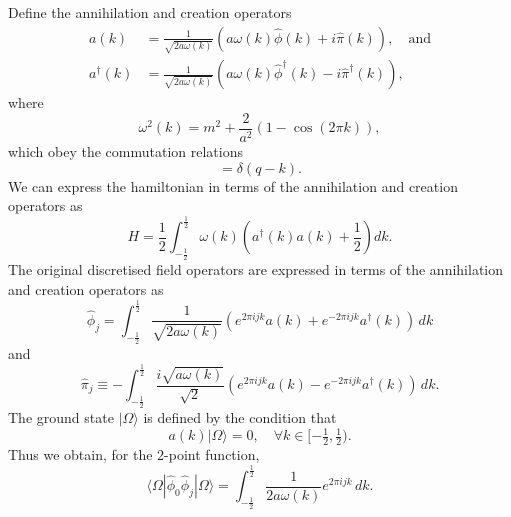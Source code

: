 \documentclass[prl,twocolumn,lengthcheck,superscriptaddress]{revtex4-1}
\theoremstyle{definition}
\theoremstyle{remark}
\begin{document}
Define the annihilation and creation operators
\begin{equation}
	\begin{split}
		a(k) &= \frac{1}{\sqrt{2a\omega(k)}}(a\omega(k)\widehat{\phi}(k) + i\widehat{\pi}(k)), \quad \text{and} \\ 
		a^\dag(k) &= \frac{1}{\sqrt{2a\omega(k)}}(a\omega(k)\widehat{\phi}^\dag(k) - i\widehat{\pi}^\dag(k)),
	\end{split}
\end{equation}
where 
\begin{equation}
	\omega^2(k) = m^2 + \frac{2}{a^2}\left(1-\cos\left(2\pi k\right)\right),
\end{equation}
 which obey the commutation relations
\begin{equation}
	[a(k), a^\dag(q)] = \delta(q-k).
\end{equation}
We can express the hamiltonian in terms of the annihilation and creation operators as
\begin{equation}
	H = \frac12\int_{-\frac{1}{2}}^{\frac{1}{2}} \omega(k)\left(a^\dag(k)a(k) + \frac12\right) dk.
\end{equation}
The original discretised field operators are expressed in terms of the annihilation and creation operators as 
\begin{equation}
	\widehat{\phi}_j = \int_{-\frac{1}{2}}^{\frac{1}{2}} \frac{1}{\sqrt{2a\omega(k)}}\left(e^{2\pi ijk} a(k)+e^{-2\pi ijk} a^\dag(k)\right)\,dk
\end{equation}
and
\begin{equation}
	\widehat{\pi}_j \equiv -\int_{-\frac{1}{2}}^{\frac{1}{2}} \frac{i\sqrt{a\omega(k)}}{\sqrt{2}}\left(e^{2\pi ijk}a(k) - e^{-2\pi ijk}a^\dag(k)\right)\,dk.
\end{equation}
The ground state $|\Omega\rangle$ is defined by the condition that 
\begin{equation}
	a(k)|\Omega\rangle = 0, \quad \forall k\in [-\tfrac12,\tfrac12).
\end{equation}
Thus we obtain, for the $2$-point function,
\begin{equation}
	\langle \Omega|\widehat{\phi}_0\widehat{\phi}_j |\Omega\rangle = \int_{-\frac{1}{2}}^{\frac{1}{2}} \frac{1}{2a\omega(k)} e^{2\pi i jk}\,dk.
\end{equation}
\end{document}
